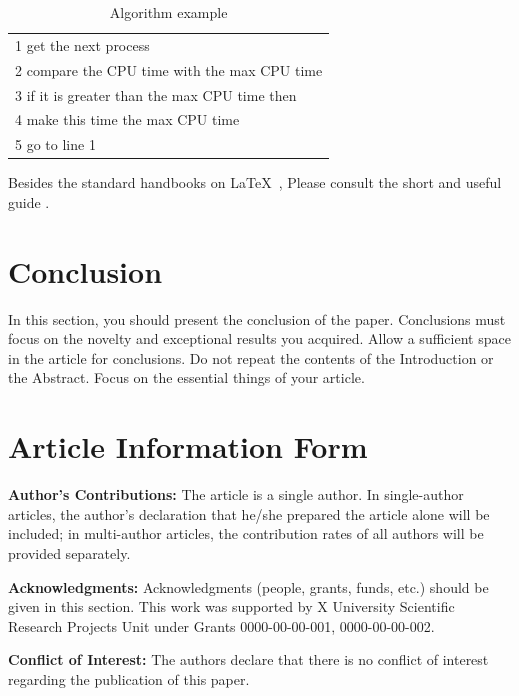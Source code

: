\documentclass[final, 9pt, onecolumn]{saucis}
\begin{document}
\begin{table}[!htb]
\centering
\caption{Algorithm example}
\label{alg:example}
\begin{tabular}{p{}}
\hline
1 \quad get the next process\\
2 \quad compare the CPU time with the max CPU time\\
3 \quad if it is greater than the max CPU time then\\
4 \qquad make this time the max CPU time\\
5 \quad go to line 1\\
\hline
\end{tabular}
\end{table}

Besides the standard handbooks on \LaTeX\  \cite{gre, koc, lop},
Please consult the short and useful guide \cite{TrzD}.

\section{Conclusion}

In this section, you should present the conclusion of the paper. Conclusions must focus on the novelty and exceptional results you acquired. Allow a sufficient space in the article for conclusions. Do not repeat the contents of the Introduction or the Abstract. Focus on the essential things of your article.

\section*{Article Information Form}
\vspace{0.2cm}

\textbf{Author's Contributions:}
The article is a single author. In single-author articles, the author's declaration that he/she prepared the article alone will be included; in multi-author articles, the contribution rates of all authors will be provided separately.\vspace{0.2cm}

\textbf{Acknowledgments:}
Acknowledgments (people, grants, funds, etc.) should be given in this section.
This work was supported by X University Scientific Research Projects Unit under Grants 0000-00-00-001, 0000-00-00-002.\vspace{0.2cm}


\textbf{Conflict of Interest:}
The authors declare that there is no conflict of interest regarding the publication of this paper. \vspace{0.2cm}
\end{document}
